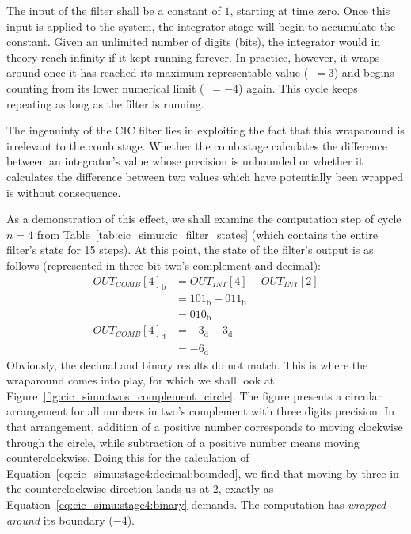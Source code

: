 The  input  of the  filter  shall  be a  constant  of  $1$, starting  at  time
zero. Once this  input is  applied to  the system,  the integrator  stage will
begin  to  accumulate  the  constant. Given  an  unlimited  number  of  digits
(bits),  the integrator  would in  theory reach  infinity if  it kept  running
forever. In practice, however, it wraps around once it has reached its maximum
representable value  (~$ =  3$) and begins  counting from  its lower
numerical limit  (~$=-4$) again. This cycle keeps  repeating as long
as the filter is running.

The  ingenuinty of  the  CIC filter  lies  in exploiting  the  fact that  this
wraparound is irrelevant to the  comb stage. Whether the comb stage calculates
the difference between  an integrator's value whose precision  is unbounded or
whether it calculates the difference between two values which have potentially
been  wrapped  is  without  consequence.

As a  demonstration of this effect,  we shall examine the  computation step of
cycle $n = 4$  from Table~\ref{tab:cic_simu:cic_filter_states} (which contains
the  entire filter's  state for  15 steps). At  this point,  the state  of the
filter's output is  as follows (represented in three-bit  two's complement and
decimal):
\begin{align}
    OUT_{COMB}[4]_\mathrm{b} &= OUT_{INT}[4] - OUT_{INT}[2]     \nonumber\\
                             &= 101_\mathrm{b} - 011_\mathrm{b} \nonumber\\
                             &= 010_\mathrm{b}
    \label{eq:cic_simu:stage4:binary} \\
    OUT_{COMB}[4]_\mathrm{d} &= -3_\mathrm{d} - 3_\mathrm{d}    \nonumber\\
                             &= -6_\mathrm{d}
    \label{eq:cic_simu:stage4:decimal:bounded}
\end{align}
Obviously,   the  decimal   and   binary  results   do   not  match. This   is
where   the  wraparound   comes   into   play,  for   which   we  shall   look
at  Figure~\ref{fig:cic_simu:twos_complement_circle}. The  figure  presents  a
circular  arrangement  for   all  numbers  in  two's   complement  with  three
digits  precision.   In  that  arrangement,  addition  of  a  positive  number
corresponds to  moving clockwise  through the circle,  while subtraction  of a
positive number means moving  counterclockwise. Doing this for the calculation
of  Equation~\ref{eq:cic_simu:stage4:decimal:bounded},  we  find  that  moving
by  three  in  the  counterclockwise   direction  lands  us  at  $2$,  exactly
as   Equation~\ref{eq:cic_simu:stage4:binary}  demands. The   computation  has
\emph{wrapped around} its boundary ($-4$).

